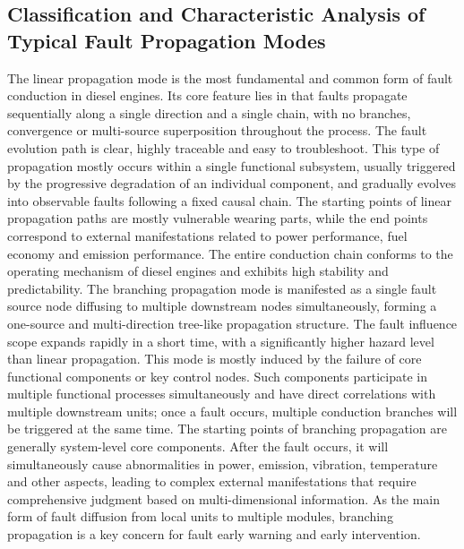 \documentclass[conference]{IEEEconf}
\begin{document}
\subsection{Classification and Characteristic Analysis of Typical Fault Propagation Modes}
The linear propagation mode is the most fundamental and common form of fault conduction in diesel engines. Its core feature lies in that faults propagate sequentially along a single direction and a single chain, with no branches, convergence or multi-source superposition throughout the process\cite{buldyrev2010catastrophic}. The fault evolution path is clear, highly traceable and easy to troubleshoot\cite{gan2020prognostics}. This type of propagation mostly occurs within a single functional subsystem, usually triggered by the progressive degradation of an individual component, and gradually evolves into observable faults following a fixed causal chain. The starting points of linear propagation paths are mostly vulnerable wearing parts, while the end points correspond to external manifestations related to power performance, fuel economy and emission performance. The entire conduction chain conforms to the operating mechanism of diesel engines and exhibits high stability and predictability.
The branching propagation mode is manifested as a single fault source node diffusing to multiple downstream nodes simultaneously, forming a one-source and multi-direction tree-like propagation structure\cite{xing2008fault}. The fault influence scope expands rapidly in a short time, with a significantly higher hazard level than linear propagation. This mode is mostly induced by the failure of core functional components or key control nodes\cite{loria2018strict}. Such components participate in multiple functional processes simultaneously and have direct correlations with multiple downstream units; once a fault occurs, multiple conduction branches will be triggered at the same time. The starting points of branching propagation are generally system-level core components. After the fault occurs, it will simultaneously cause abnormalities in power, emission, vibration, temperature and other aspects, leading to complex external manifestations that require comprehensive judgment based on multi-dimensional information\cite{liu2020robust}. As the main form of fault diffusion from local units to multiple modules, branching propagation is a key concern for fault early warning and early intervention.
\end{document}
